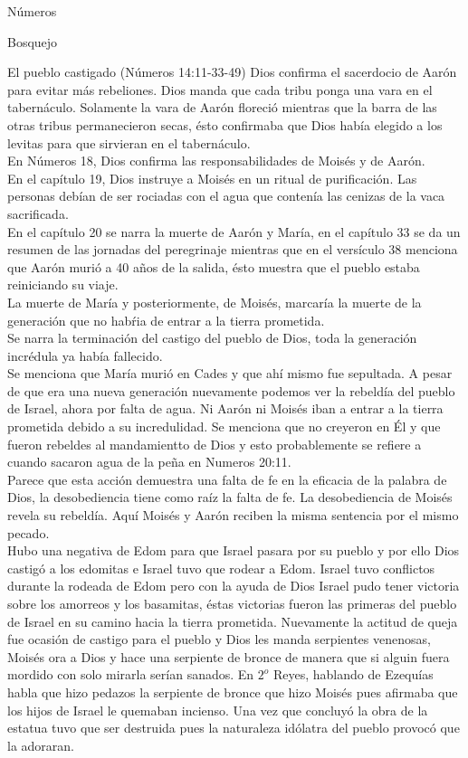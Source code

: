 \begin{section}{Números}
\begin{subsection}{Bosquejo}
\begin{subsubsection}{El pueblo castigado (Números 14:11-33-49)}
			Dios confirma el sacerdocio de Aarón para evitar más rebeliones. Dios manda que cada tribu ponga una vara en el tabernáculo. Solamente la vara de Aarón floreció mientras que la barra de las otras tribus permanecieron secas, ésto confirmaba que Dios había elegido a los levitas para que sirvieran en el tabernáculo. \\
			En Números 18, Dios confirma las responsabilidades de Moisés y de Aarón.\\
			En el capítulo 19, Dios instruye a Moisés en un ritual de purificación. Las personas debían de ser rociadas con el agua que contenía las cenizas de la vaca sacrificada.\\
			En el capítulo 20 se narra la muerte de Aarón y María, en el capítulo 33 se da un resumen de las jornadas del peregrinaje mientras que en el versículo 38 menciona que Aarón murió a 40 años de la salida, ésto muestra que el pueblo estaba reiniciando su viaje.\\
			La muerte de María y posteriormente, de Moisés, marcaría la muerte de la generación que no habŕia de entrar a la tierra prometida.\\
			Se narra la terminación del castigo del pueblo de Dios, toda la generación incrédula ya había fallecido.\\
			Se menciona que María murió en Cades y que ahí mismo fue sepultada. A pesar de que era una nueva generación nuevamente podemos ver la rebeldía del pueblo de Israel, ahora por falta de agua. Ni Aarón ni Moisés iban a entrar a la tierra prometida debido a su incredulidad. Se menciona que no creyeron en Él y que fueron rebeldes al mandamientto de Dios y esto probablemente se refiere a cuando sacaron agua de la peña en Numeros 20:11.\\
			Parece que esta acción demuestra una falta de fe en la eficacia de la palabra de Dios, la desobediencia tiene como raíz la falta de fe. La desobediencia de Moisés revela su rebeldía. Aquí Moisés y Aarón reciben la misma sentencia por el mismo pecado.\\
			Hubo una negativa de Edom para que Israel pasara por su pueblo y por ello Dios castigó a los edomitas e Israel tuvo que rodear a Edom. Israel tuvo conflictos durante la rodeada de Edom pero con la ayuda de Dios Israel pudo tener victoria sobre los amorreos y los basamitas, éstas victorias fueron las primeras del pueblo de Israel en su camino hacia la tierra prometida. Nuevamente la actitud de queja fue ocasión de castigo para el pueblo y Dios les manda serpientes venenosas, Moisés ora a Dios y hace una serpiente de bronce de manera que si alguin fuera mordido con solo mirarla serían sanados. En $2^o$ Reyes, hablando de Ezequías habla que hizo pedazos la serpiente de bronce que hizo Moisés pues afirmaba que los hijos de Israel le quemaban incienso. Una vez que concluyó la obra de la estatua tuvo que ser destruida pues la naturaleza idólatra del pueblo provocó que la adoraran.\\

\end{subsubsection}
\end{subsection}
\end{section}
